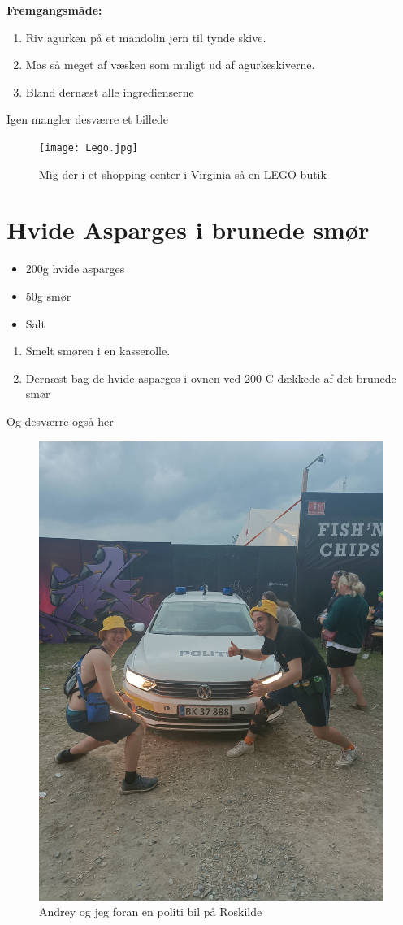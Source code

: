 \documentclass{book}
\begin{document}
\begin{minipage}[t]{0.5\textwidth}
\textbf{Fremgangsmåde:}
\begin{enumerate}
    \item Riv agurken på et mandolin jern til tynde skive.
    \item Mas så meget af væsken som muligt ud af agurkeskiverne.
    \item Bland dernæst alle ingredienserne
\end{enumerate}
\end{minipage}
\newpage 
Igen mangler desværre et billede 
\begin{figure}
    \centering
    \texttt{[image: Lego.jpg]}
    \caption{Mig der i et shopping center i Virginia så en LEGO butik}
    
\end{figure}
\newpage \section{Hvide Asparges i brunede smør}
\begin{minipage}[t]{0.5\textwidth}
\begin{itemize}
    \item 200g hvide asparges 
    \item 50g smør
    \item Salt
\end{itemize}
\end{minipage}
\begin{minipage}[t]{0.5\textwidth}
\begin{enumerate}
    \item Smelt smøren i en kasserolle.
    \item Dernæst bag de hvide asparges i ovnen ved 200 \degree C dækkede af det brunede smør
\end{enumerate}
\end{minipage}
\newpage 
Og desværre også her 
\begin{figure}
    \centering
    \includegraphics[width=0.5\linewidth]{Roskilde.jpg}
    \caption{Andrey og jeg foran en politi bil på Roskilde}
    
\end{figure}
\end{document}
